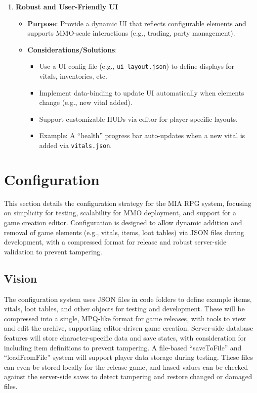 \begin{enumerate}
    \item \textbf{Robust and User-Friendly UI}
        \begin{itemize}
            \item \textbf{Purpose}: Provide a dynamic UI that reflects configurable elements and supports MMO-scale interactions (e.g., trading, party management).
            \item \textbf{Considerations/Solutions}:
                \begin{itemize}
                    \item Use a UI config file (e.g., \texttt{ui\_layout.json}) to define displays for vitals, inventories, etc.
                    \item Implement data-binding to update UI automatically when elements change (e.g., new vital added).
                    \item Support customizable HUDs via editor for player-specific layouts.
                    \item Example: A ``health'' progress bar auto-updates when a new vital is added via \texttt{vitals.json}.
                \end{itemize}
        \end{itemize}
\end{enumerate}














\section{Configuration}

This section details the configuration strategy for the MIA RPG system, focusing on simplicity for testing, scalability for MMO deployment, and support for a game creation editor. Configuration is designed to allow dynamic addition and removal of game elements (e.g., vitals, items, loot tables) via JSON files during development, with a compressed format for release and robust server-side validation to prevent tampering.

\subsection{Vision}
The configuration system uses JSON files in code folders to define example items, vitals, loot tables, and other objects for testing and development. These will be compressed into a single, MPQ-like format for game releases, with tools to view and edit the archive, supporting editor-driven game creation. Server-side database features will store character-specific data and save states, with consideration for including item definitions to prevent tampering. A file-based ``saveToFile'' and ``loadFromFile'' system will support player data storage during testing. These files can even be stored locally for the release game, and hased values can be checked against the server-side saves to detect tampering and restore changed or damaged files.

